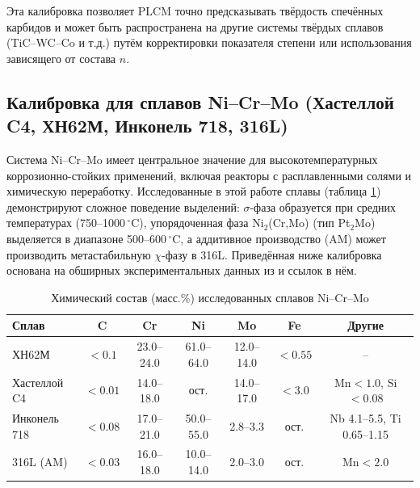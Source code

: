 \documentclass[12pt,a4paper]{article}
\begin{document}
	Эта калибровка позволяет PLCM точно предсказывать твёрдость спечённых карбидов и может быть распространена на другие системы твёрдых сплавов (TiC–WC–Co и т.д.) путём корректировки показателя степени или использования зависящего от состава $n$.
	
	
	\subsection{Калибровка для сплавов Ni–Cr–Mo (Хастеллой C4, ХН62М, Инконель 718, 316L)}
	\label{subsec:calibration_nicrmo}
	
	Система Ni–Cr–Mo имеет центральное значение для высокотемпературных коррозионно-стойких применений, включая реакторы с расплавленными солями и химическую переработку. Исследованные в этой работе сплавы (таблица \ref{tab:nicrmo_compositions}) демонстрируют сложное поведение выделений: $\sigma$-фаза образуется при средних температурах (750–1000\,\(^{\circ}\)C), упорядоченная фаза Ni$_2$(Cr,Mo) (тип Pt$_2$Mo) выделяется в диапазоне 500–600\,\(^{\circ}\)C, а аддитивное производство (AM) может производить метастабильную $\chi$-фазу в 316L. Приведённая ниже калибровка основана на обширных экспериментальных данных из \cite{dis2025} и ссылок в нём.
	
	\begin{table}[htbp]
		\centering
		\caption{Химический состав (масс.\%) исследованных сплавов Ni–Cr–Mo}
		\label{tab:nicrmo_compositions}
		\begin{tabular}{lcccccc}
			\toprule
			\textbf{Сплав} & \textbf{C} & \textbf{Cr} & \textbf{Ni} & \textbf{Mo} & \textbf{Fe} & \textbf{Другие} \\
			\midrule
			ХН62М & \(<0.1\) & 23.0–24.0 & 61.0–64.0 & 12.0–14.0 & \(<0.55\) & – \\
			Хастеллой C4   & \(<0.01\) & 14.0–18.0 & ост. & 14.0–17.0 & \(<3.0\) & Mn\(<1.0\), Si\(<0.08\) \\
			Инконель 718    & \(<0.08\) & 17.0–21.0 & 50.0–55.0 & 2.8–3.3 & ост. & Nb 4.1–5.5, Ti 0.65–1.15 \\
			316L (AM)      & \(<0.03\) & 16.0–18.0 & 10.0–14.0 & 2.0–3.0 & ост. & Mn\(<2.0\) \\
			\bottomrule
		\end{tabular}
	\end{table}
	
\end{document}
